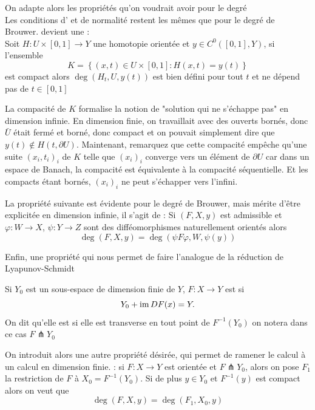 \documentclass[memoire.tex]{subfiles}
\begin{document}
On adapte alors les propriétés qu'on voudrait avoir pour  le degré \\
Les conditions d' et de \coldef
{normalité} restent les mêmes que pour le degré de Brouwer.  devient une :\\  Soit $H: U\times [0,1]\rightarrow Y$ une homotopie orientée et $y\in C^0([0,1],Y)$, si l'ensemble 
\begin{equation}\label{K-dude}
    K=\left\{(x,t)\in U\times [0,1]: H(x,t)=y(t) \right\}
\end{equation}
est compact alors $\deg (H_t,U,y(t))$ est bien défini pour tout $t$ et ne dépend pas de $t\in [0,1]$\\
\begin{remarque}
    La compacité de $K$ formalise 
    la notion de "solution qui ne 
    s'échappe pas" en dimension 
    infinie. En dimension finie, on 
    travaillait avec des ouverts 
    bornés, donc $\bar{U}$ était 
    fermé et borné, donc compact et on pouvait simplement dire que $y(t)\notin H(t,\partial U)$. Maintenant, remarquez que cette compacité empêche qu'une suite $(x_i,t_i)_i$ de  $K$ telle que $(x_i)_i$  converge vers un élément de $\partial U$  car dans un espace de Banach, la compacité est équivalente à la compacité séquentielle. Et les compacts étant bornés, $(x_i)_i$ ne peut s'échapper vers l'infini.
\end{remarque}
La propriété suivante est évidente pour le degré de Brouwer, mais mérite d'être explicitée  en dimension infinie, il s'agit de : Si $(F,X,y)$ est admissible et $\varphi: W\rightarrow X$, $\psi: Y\rightarrow Z$ sont des difféomorphismes naturellement orientés alors 
\begin{equation*}
    \deg(F,X,y)=\deg(\psi F \varphi, W, \psi(y))
\end{equation*}

Enfin, une propriété qui nous permet de faire l'analogue de la réduction de Lyapunov-Schmidt
\begin{definition}
   Si $Y_0$ est un sous-espace de dimension finie de $Y$,  $F:X\rightarrow Y$ est  si
   \begin{equation*}
    Y_0+\operatorname{im} DF(x)=Y.
   \end{equation*}
   On dit qu'elle est  si elle est transverse en tout point de $F^{-1}(Y_0)$
   on notera dans ce cas $F\pitchfork Y_0$
\end{definition}
On introduit alors une autre propriété désirée, qui permet de ramener le calcul à un calcul en dimension finie.
: si $F:X\rightarrow Y$ est orientée et $F\pitchfork Y_0$, alors on pose  $F_1$ la restriction de $F$ à $X_0=F^{-1}(Y_0)$. Si de plus $y\in Y_0$ et $F^{-1}(y)$ est compact alors on veut que
\begin{equation*}
    \deg (F,X,y)=\deg(F_1,X_0,y)
\end{equation*}
\end{document}
